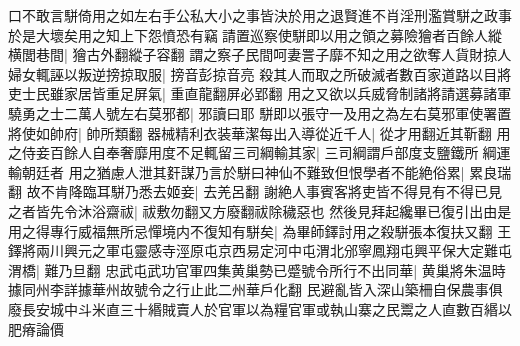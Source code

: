 口不敢言駢倚用之如左右手公私大小之事皆決於用之退賢進不肖淫刑濫賞駢之政事於是大壞矣用之知上下怨憤恐有竊請置巡察使駢即以用之領之募險獪者百餘人縱横閭巷間|{
	獪古外翻縱子容翻}
謂之察子民間呵妻詈子靡不知之用之欲奪人貨財掠人婦女輒誣以叛逆搒掠取服|{
	搒音彭掠音亮}
殺其人而取之所破滅者數百家道路以目將吏士民雖家居皆重足屏氣|{
	重直龍翻屏必郢翻}
用之又欲以兵威脅制諸將請選募諸軍驍勇之士二萬人號左右莫邪都|{
	邪讀曰耶}
駢即以張守一及用之為左右莫邪軍使署置將使如帥府|{
	帥所類翻}
器械精利衣装華潔每出入導從近千人|{
	從才用翻近其靳翻}
用之侍妾百餘人自奉奢靡用度不足輒留三司綱輸其家|{
	三司綱謂戶部度支鹽鐵所綱運輸朝廷者}
用之猶慮人泄其姧謀乃言於駢曰神仙不難致但恨學者不能絶俗累|{
	累良瑞翻}
故不肯降臨耳駢乃悉去姬妾|{
	去羌呂翻}
謝絶人事賓客將吏皆不得見有不得已見之者皆先令沐浴齋祓|{
	祓敷勿翻又方廢翻祓除穢惡也}
然後見拜起纔畢已復引出由是用之得專行威福無所忌憚境内不復知有駢矣|{
	為畢師鐸討用之殺駢張本復扶又翻}
王鐸將兩川興元之軍屯靈感寺涇原屯京西易定河中屯渭北邠寧鳳翔屯興平保大定難屯渭橋|{
	難乃旦翻}
忠武屯武功官軍四集黄巢勢已蹙號令所行不出同華|{
	黄巢將朱温時據同州李詳據華州故號令之行止此二州華戶化翻}
民避亂皆入深山築柵自保農事俱廢長安城中斗米直三十緡賊賣人於官軍以為糧官軍或執山寨之民鬻之人直數百緡以肥瘠論價

